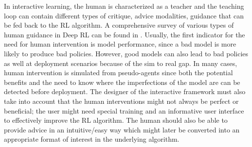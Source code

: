 \documentclass[twoside,11pt]{article}
\begin{document}



In interactive learning, the human is characterized as a teacher and the teaching loop can contain different types of critique, advice modalities, guidance that can be fed back to the RL algorithm. A comprehensive survey of various types of human guidance in Deep RL can be found in \cite{zhang2019leveraging}. Usually, the first indicator for the need for human intervention is model performance, since a bad model is more likely to produce bad policies. However, good models can also lead to bad policies as well at deployment scenarios because of the sim to real gap. In many cases, human intervention is simulated from pseudo-agents since both the potential benefits and the need to know where the imperfections of the model are can be detected before deployment. The designer of the interactive framework must also take into account that the human interventions might not always be perfect or beneficial; the user might need special training and an informative user interface to effectively improve the RL algorithm. The human should also be able to provide advice in an intuitive/easy way which might later be converted into an appropriate format of interest in the underlying algorithm.
\end{document}
